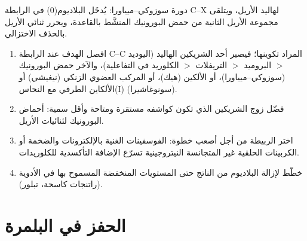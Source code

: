 \begin{omfigure}

{\small دورة سوزوكي--ميياورا: يُدخَل البلاديوم(0) في الرابطة C--X لهاليد
الأريل، ويتلقى مجموعة الأريل الثانية من حمض البورونيك المنشَّط بالقاعدة،
ويحرر ثنائي الأريل بالحذف الاختزالي.}
\end{omfigure}

\begin{method}\label{met:b3:homogeneous-catalysis:choose-coupling}
\begin{enumerate}
  \item افصل الهدف عند الرابطة C--C المراد تكوينها؛ فيصير أحد الشريكين
        الهاليد (اليوديد $>$ البروميد $>$ التريفلات $>$ الكلوريد في التفاعلية)، والآخر
        حمض البورونيك (سوزوكي--ميياورا)، أو الألكين (هيك)، أو المركب العضوي الزنكي
        (نيغيشي) أو الألكاين الطرفي مع النحاس(I) (سونوغاشيرا).
  \item فضّل زوج الشريكين الذي تكون كواشفه مستقرة ومتاحة وأقل
        سمية: أحماض البورونيك لثنائيات الأريل.
  \item اختر الربيطة من أجل أصعب خطوة: الفوسفينات الغنية بالإلكترونات والضخمة
        أو الكربينات الحلقية غير المتجانسة النيتروجينية تسرّع الإضافة التأكسدية للكلوريدات.
  \item خطّط لإزالة البلاديوم من الناتج حتى المستويات المنخفضة
        المسموح بها في الأدوية (راتنجات كاسحة، تبلور).
\end{enumerate}
\end{method}

\section{الحفز في البلمرة}


